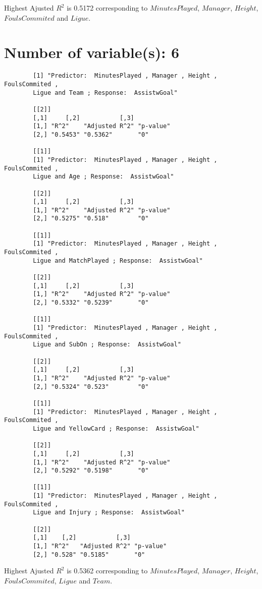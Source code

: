 \documentclass[12pt]{article}
\begin{document}
	Highest Ajusted $ R^2 $ is 0.5172 corresponding to $ MinutesPlayed $, $ Manager $, $ Height $, $ FoulsCommited $ and $ Ligue $.
	
	\section{Number of variable(s): 6}
	
	\begin{verbatim}
		[1] "Predictor:  MinutesPlayed , Manager , Height , FoulsCommited , 
		Ligue and Team ; Response:  AssistwGoal"
		
		[[2]]
		[,1]     [,2]           [,3]     
		[1,] "R^2"    "Adjusted R^2" "p-value"
		[2,] "0.5453" "0.5362"       "0"      
		
		[[1]]
		[1] "Predictor:  MinutesPlayed , Manager , Height , FoulsCommited , 
		Ligue and Age ; Response:  AssistwGoal"
		
		[[2]]
		[,1]     [,2]           [,3]     
		[1,] "R^2"    "Adjusted R^2" "p-value"
		[2,] "0.5275" "0.518"        "0"      
		
		[[1]]
		[1] "Predictor:  MinutesPlayed , Manager , Height , FoulsCommited , 
		Ligue and MatchPlayed ; Response:  AssistwGoal"
		
		[[2]]
		[,1]     [,2]           [,3]     
		[1,] "R^2"    "Adjusted R^2" "p-value"
		[2,] "0.5332" "0.5239"       "0"      
		
		[[1]]
		[1] "Predictor:  MinutesPlayed , Manager , Height , FoulsCommited , 
		Ligue and SubOn ; Response:  AssistwGoal"
		
		[[2]]
		[,1]     [,2]           [,3]     
		[1,] "R^2"    "Adjusted R^2" "p-value"
		[2,] "0.5324" "0.523"        "0"      
		
		[[1]]
		[1] "Predictor:  MinutesPlayed , Manager , Height , FoulsCommited , 
		Ligue and YellowCard ; Response:  AssistwGoal"
		
		[[2]]
		[,1]     [,2]           [,3]     
		[1,] "R^2"    "Adjusted R^2" "p-value"
		[2,] "0.5292" "0.5198"       "0"      
		
		[[1]]
		[1] "Predictor:  MinutesPlayed , Manager , Height , FoulsCommited , 
		Ligue and Injury ; Response:  AssistwGoal"
		
		[[2]]
		[,1]    [,2]           [,3]     
		[1,] "R^2"   "Adjusted R^2" "p-value"
		[2,] "0.528" "0.5185"       "0" 
	\end{verbatim}
	
	Highest Ajusted $ R^2 $ is 0.5362 corresponding to $ MinutesPlayed $, $ Manager $, $ Height $, $ FoulsCommited $, $ Ligue $ and $ Team $.
	
\end{document}

